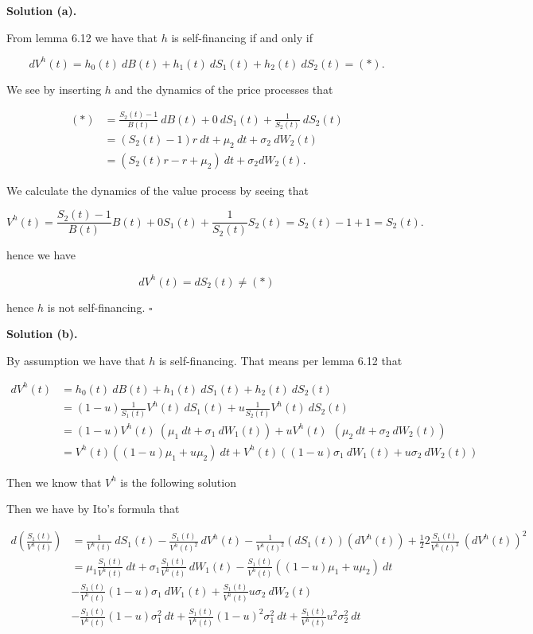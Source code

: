 \documentclass[
]{book}
\begin{document}
\noindent\makebox[\linewidth]{\rule{\textwidth}{0.4pt}}

\textbf{Solution (a).}

From lemma 6.12 we have that \(h\) is self-financing if and only if

\[
dV^h(t)=h_0(t)\ dB(t)+h_1(t)\ dS_1(t)+h_2(t)\ dS_2(t)=(*).
\]

We see by inserting \(h\) and the dynamics of the price processes that

\begin{align*}
(*)&=\frac{S_2(t)-1}{B(t)}\ dB(t)+0\ dS_1(t)+\frac{1}{S_2(t)}\ dS_2(t)\\
&=(S_2(t)-1)r\ dt+\mu_2\ dt+\sigma_2\ dW_2(t)\\
&=\left(S_2(t)r-r+\mu_2\right)\ dt+\sigma_2 dW_2(t).
\end{align*}

We calculate the dynamics of the value process by seeing that

\[
V^h(t)=\frac{S_2(t)-1}{B(t)}B(t)+0S_1(t)+\frac{1}{S_2(t)}S_2(t)=S_2(t)-1+1=S_2(t).
\]

hence we have

\[
dV^h(t)=dS_2(t)\ne(*)
\]

hence \(h\) is not self-financing. \(\square\)

\noindent\makebox[\linewidth]{\rule{\textwidth}{0.4pt}}

\textbf{Solution (b).}

By assumption we have that \(h\) is self-financing. That means per lemma 6.12 that

\begin{align*}
dV^h(t)&=h_0(t)\ dB(t)+h_1(t)\ dS_1(t)+h_2(t)\ dS_2(t)\\
&=(1-u)\frac{1}{S_1(t)}V^h(t)\ dS_1(t)+u\frac{1}{S_2(t)}V^h(t)\ dS_2(t)\\
&=(1-u)V^h(t)\ (\mu_1 \ dt+\sigma_1\ dW_1(t))+uV^h(t)\ \ (\mu_2 \ dt+\sigma_2\ dW_2(t))\\
&=V^h(t)\left((1-u)\mu_1+u\mu_2\right)\ dt+V^h(t)\left((1-u)\sigma_1\ dW_1(t)+u\sigma_2\ dW_2(t)\right)
\end{align*}

Then we know that \(V^h\) is the following solution

Then we have by Ito's formula that

\begin{align*}
d\left(\frac{S_1(t)}{V^h(t)}\right)&=\frac{1}{V^h(t)}\ dS_1(t)-\frac{S_1(t)}{V^h(t)^2}\ dV^h(t)-\frac{1}{V^h(t)^2}(dS_1(t))(dV^h(t))+\frac{1}{2}2\frac{S_1(t)}{V^h(t)^3}\ (dV^h(t))^2\\
&=\mu_1\frac{S_1(t)}{V^h(t)}\ dt+\sigma_1 \frac{S_1(t)}{V^h(t)}\ dW_1(t)-\frac{S_1(t)}{V^h(t)}((1-u)\mu_1+u\mu_2)\ dt\\
&-\frac{S_1(t)}{V^h(t)}(1-u)\sigma_1\ dW_1(t)+\frac{S_1(t)}{V^h(t)}u\sigma_2\ dW_2(t)\\
&-\frac{S_1(t)}{V^h(t)}(1-u)\sigma_1^2\ dt+\frac{S_1(t)}{V^h(t)}(1-u)^2\sigma_1^2\ dt+\frac{S_1(t)}{V^h(t)}u^2\sigma_2^2\ dt
\end{align*}
\end{document}
